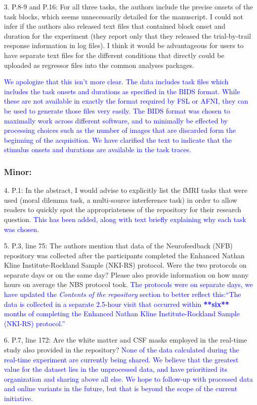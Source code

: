 \documentclass{article}
\newcommand{\RESPONSE}[1]{\textcolor{blue}{#1}}
\begin{document}
3. P.8-9 and P.16: For all three tasks, the authors include the precise onsets of the task blocks, which seems unnecessarily detailed for the manuscript. I could not infer if the authors also released text files that contained block onset and duration for the experiment (they report only that they released the trial-by-trail response information in log files). I think it would be advantageous for users to have separate text files for the different conditions that directly could be uploaded as regressor files into the common analyses packages.

\RESPONSE{We apologize that this isn't more clear. The data includes task files which includes the task onsets and durations as specified in the BIDS format. While these are not available in exactly the format required by FSL or AFNI, they can be used to generate those files very easily. The BIDS format was chosen to maximally work across different software, and to minimally be effected by processing choices such as the number of images that are discarded form the beginning of the acquisition. We have clarified the text to indicate that the stimulus onsets and durations are available in the task traces.}

\subsubsection*{Minor:}
4. P.1: In the abstract, I would advise to explicitly list the fMRI tasks that were used (moral dilemma task, a multi-source interference task) in order to allow readers to quickly spot the appropriateness of the repository for their research question.
\RESPONSE{This has been added, along with text briefly explaining why each task was chosen.}

5. P.3, line 75: The authors mention that data of the Neurofeedback (NFB) repository was collected after the participants completed the Enhanced Nathan Kline Institute-Rockland Sample (NKI-RS) protocol. Were the two protocols on separate days or on the same day? Please also provide information on how many hours on average the NBS protocol took.
\RESPONSE{The protocols were on separate days, we have updated the \emph{Contents of the repository} section to better reflect this:``The data is collected in a separate 2.5-hour visit that occurred within \textbf{**six**} months of completing the Enhanced Nathan Kline Institute-Rockland Sample (NKI-RS) protocol.''}

6. P.7, line 172: Are the white matter and CSF masks employed in the real-time study also provided in the repository?
\RESPONSE{None of the data calculated during the real-time experiment are currently being shared. We believe that the greatest value for the dataset lies in the unprocessed data, and have prioritized its organization and sharing above all else. We hope to follow-up with processed data and online variants in the future, but that is beyond the scope of the current initiative.}
\end{document}
